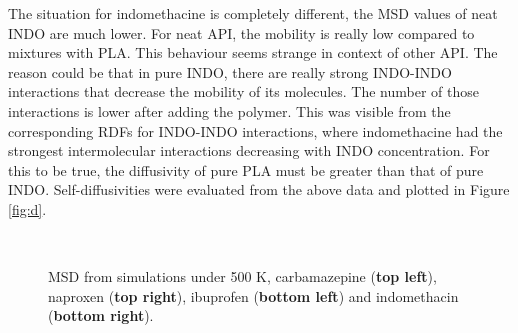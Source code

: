 The situation for indomethacine is completely different, the MSD values of neat INDO are much lower. For neat API, the mobility is really low compared to mixtures with PLA. This behaviour seems strange in context of other API. The reason could be that in pure INDO, there are really strong INDO-INDO interactions that decrease the mobility of its molecules. The number of those interactions is lower after adding the polymer. This was visible from the corresponding RDFs for INDO-INDO interactions, where indomethacine had the strongest intermolecular interactions decreasing with INDO concentration. For this to be true, the diffusivity of pure PLA must be greater than that of pure INDO. Self-diffusivities were evaluated from the above data and plotted in Figure \ref{fig:d}. 

\begin{figure}[]
	\centering
	\\
	\caption{MSD from simulations under 500 K, carbamazepine (\textbf{top left}), naproxen (\textbf{top right}), ibuprofen (\textbf{bottom left}) and indomethacin (\textbf{bottom right}).}
	\label{fig:msd_r2}    
\end{figure}

